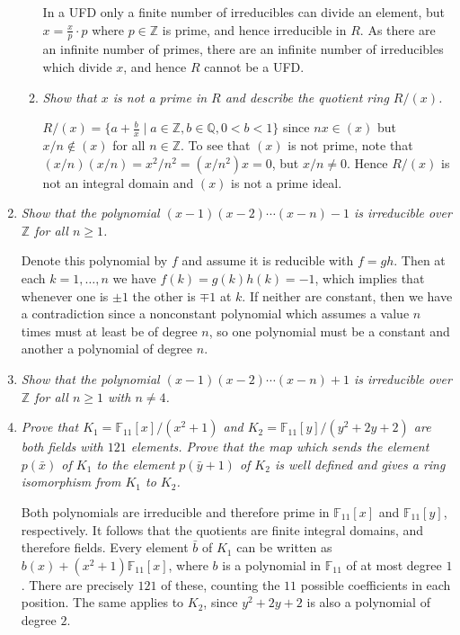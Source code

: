 \documentclass[10pt]{article}
\newcommand{\Z}{\mathbb{Z}}
\newcommand{\Q}{\mathbb{Q}}
\newcommand{\F}{\mathbb{F}}
\begin{document}
\begin{enumerate}
\begin{enumerate}
In a UFD only a finite number of irreducibles can divide an element, but $x = \frac{x}{p} \cdot p$ where $p \in \Z$ is prime, and hence irreducible in $R$.  As there are an infinite number of primes, there are an infinite number of irreducibles which divide $x$, and hence $R$ cannot be a UFD.

\item \emph{Show that $x$ is not a prime in $R$ and describe the quotient ring $R/(x)$.}

$R/(x) = \{a + \frac{b}{x} \mid a \in \Z, b \in \Q, 0 < b < 1 \}$ since $nx \in (x)$ but $x/n \notin (x)$ for all $n \in \Z$.  To see that $(x)$ is not prime, note that $(x/n)(x/n) = x^2/n^2 = (x/n^2)x = 0$, but $x/n \neq 0$.  Hence $R/(x)$ is not an integral domain and $(x)$ is not a prime ideal.

\end{enumerate}

\item \emph{Show that the polynomial $(x-1)(x-2) \cdots (x-n) - 1$ is irreducible over $\Z$ for all $n \geq 1$.}

Denote this polynomial by $f$ and assume it is reducible with $f = gh$.  Then at each $k = 1, \ldots, n$ we have $f(k) = g(k)h(k) = -1$, which implies that whenever one is $\pm 1$ the other is $\mp 1$ at $k$.  If neither are constant, then we have a contradiction since a nonconstant polynomial which assumes a value $n$ times must at least be of degree $n$, so one polynomial must be a constant and another a polynomial of degree $n$.

\item \emph{Show that the polynomial $(x-1)(x-2) \cdots (x-n) + 1$ is irreducible over $\Z$ for all $n \geq 1$ with $n \neq 4$.}

\item \emph{Prove that $K_1 = \F_{11}[x] / (x^2+1)$ and $K_2 = \F_{11}[y]/(y^2+2y+2)$ are both fields with $121$ elements.  Prove that the map which sends the element $p(\bar{x})$ of $K_1$ to the element $p(\bar{y}+1)$ of $K_2$ is well defined and gives a ring isomorphism from $K_1$ to $K_2$.}

Both polynomials are irreducible and therefore prime in $\F_{11}[x]$ and $\F_{11}[y]$, respectively.  It follows that the quotients are finite integral domains, and therefore fields.  Every element $\bar{b}$ of $K_1$ can be written as $b(x) + (x^2+1)\F_{11}[x]$, where $b$ is a polynomial in $\F_{11}$ of at most degree $1$.  There are precisely $121$ of these, counting the $11$ possible coefficients in each position.  The same applies to $K_2$, since $y^2+2y+2$ is also a polynomial of degree $2$.


\end{enumerate}
\end{document}
